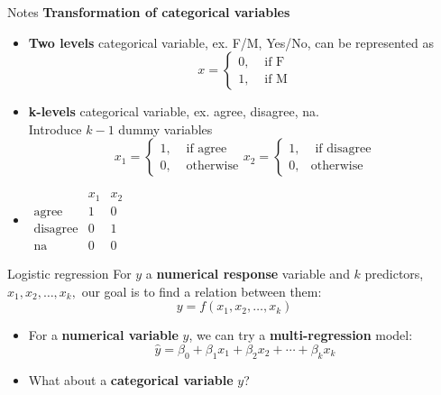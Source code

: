 \documentclass[12pt,a4paper]{beamer}
\begin{document}
			\begin{frame}{Notes}
				\textbf{Transformation of categorical variables}
			\small	\begin{itemize}
					\item\textbf{Two levels} categorical variable, ex. F/M, Yes/No, can be represented as
				\small	\[x=\left\{\begin{array}{lr} 0,& \text{ if F}\\
					1, &\text{ if M}\end{array}\right.\]
					\item \textbf{k-levels} categorical variable, ex. agree, disagree, na.
					\\ Introduce $k-1$ dummy variables
					\[x_1=\left\{\begin{array}{lr} 1,& \text{ if agree }\\
					0, &\text{ otherwise}\end{array}\right. x_2=\left\{\begin{array}{lr} 1,& \text{ if disagree}\\
					0, &\text{otherwise}\end{array}\right.\]
					\item $\begin{array}{ccc}
					& x_1 & x_2\\
					\text{agree}& 1 & 0\\
					\text{disagree}&0&1\\
					\text{na}&0&0 
					\end{array}$
				\end{itemize}

			\end{frame}
			\begin{frame}{Logistic regression}
				For $y$  a \textbf{numerical response} variable and $k$ predictors, $x_1,x_2,\dots,x_k,$ our goal is to find a relation between them:
				\[y=f(x_1,x_2,\dots,x_k)\]
				\begin{itemize}
					\item  For a \textbf{numerical  variable} $y$, we can try a \textbf{multi-regression} model:
				\[\hat{y} = \beta_0 + \beta_1 x_1 + \beta_2 x_2 + \cdots + \beta_k x_k \]
	\item What about a \textbf{categorical variable} $y$?
			\end{itemize}
				\end{frame}
\end{document}
